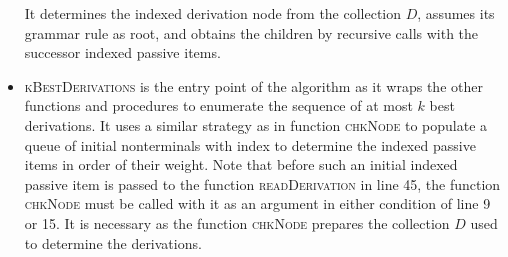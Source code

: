 \documentclass[../../document.tex]{subfiles}
\begin{document}
\begin{itemize}
            It determines the indexed derivation node from the collection \(D\), assumes its grammar rule as root, and obtains the children by recursive calls with the successor indexed passive items.
        \item \textsc{kBestDerivations} is the entry point of the algorithm as it wraps the other functions and procedures to enumerate the sequence of at most \(k\) best derivations.
            It uses a similar strategy as in function \textsc{chkNode} to populate a queue of initial nonterminals with index to determine the indexed passive items in order of their weight.
            Note that before such an initial indexed passive item is passed to the function \textsc{readDerivation} in line 45, the function \textsc{chkNode} must be called with it as an argument in either condition of line 9 or 15.
            It is necessary as the function \textsc{chkNode} prepares the collection \(D\) used to determine the derivations.
    \end{itemize}
    
\end{document}
